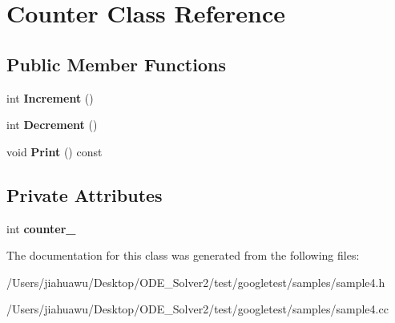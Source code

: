 \hypertarget{class_counter}{}\section{Counter Class Reference}
\label{class_counter}
\subsection*{Public Member Functions}
\begin{DoxyCompactItemize}
\item 
\mbox{\label{class_counter_a0a0ca9fdb580a2aec9a5a62ebed2b5ab}} 
int {\bfseries Increment} ()
\item 
\mbox{\label{class_counter_aa58d9b4f0bd96fc2331234493eb21bed}} 
int {\bfseries Decrement} ()
\item 
\mbox{\label{class_counter_a80092ec2a0deea0870b2e9f8ad0906bd}} 
void {\bfseries Print} () const
\end{DoxyCompactItemize}
\subsection*{Private Attributes}
\begin{DoxyCompactItemize}
\item 
\mbox{\label{class_counter_abdef0bf73f0a68177863c42c6eba2fc0}} 
int {\bfseries counter\+\_\+}
\end{DoxyCompactItemize}


The documentation for this class was generated from the following files\+:\begin{DoxyCompactItemize}
\item 
/\+Users/jiahuawu/\+Desktop/\+O\+D\+E\+\_\+\+Solver2/test/googletest/samples/sample4.\+h\item 
/\+Users/jiahuawu/\+Desktop/\+O\+D\+E\+\_\+\+Solver2/test/googletest/samples/sample4.\+cc\end{DoxyCompactItemize}
